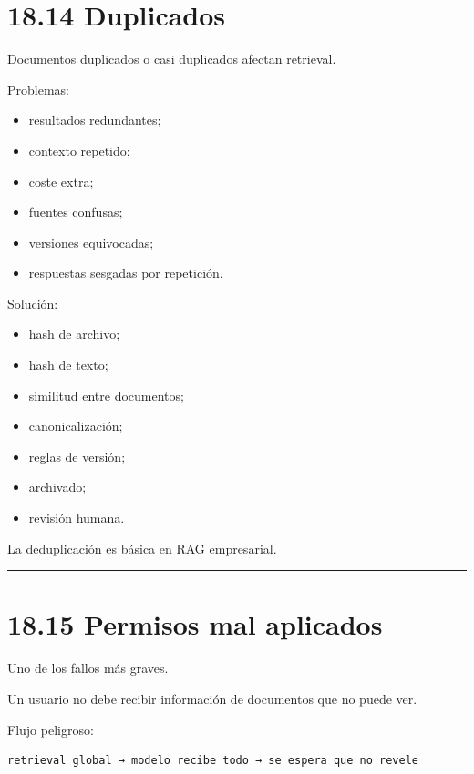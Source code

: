\section{18.14 Duplicados}\label{duplicados}

Documentos duplicados o casi duplicados afectan retrieval.

Problemas:

\begin{itemize}
\tightlist
\item
  resultados redundantes;
\item
  contexto repetido;
\item
  coste extra;
\item
  fuentes confusas;
\item
  versiones equivocadas;
\item
  respuestas sesgadas por repetición.
\end{itemize}

Solución:

\begin{itemize}
\tightlist
\item
  hash de archivo;
\item
  hash de texto;
\item
  similitud entre documentos;
\item
  canonicalización;
\item
  reglas de versión;
\item
  archivado;
\item
  revisión humana.
\end{itemize}

La deduplicación es básica en RAG empresarial.

\begin{center}\rule{0.5\linewidth}{0.5pt}\end{center}

\section{18.15 Permisos mal aplicados}\label{permisos-mal-aplicados}

Uno de los fallos más graves.

Un usuario no debe recibir información de documentos que no puede ver.

Flujo peligroso:

\begin{lstlisting}
retrieval global → modelo recibe todo → se espera que no revele
\end{lstlisting}

